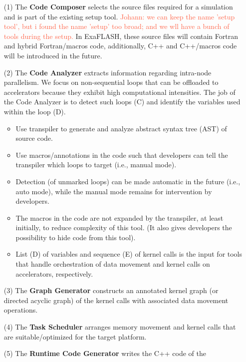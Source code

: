 \documentclass{article}
\newcommand{\FlashOfTheFuture}{ExaFLASH\xspace}
\newcommand{\Johann}[1]         {\textcolor{Tomato}{Johann: #1}}
\begin{document}
\begin{enumerate}
  \item[(1)] The \textbf{Code Composer} selects the source files required for
    a simulation and is part of the existing setup tool.
    \Johann{we can keep the name 'setup tool', but i found the name 'setup' too
    broad; and we wll have a bunch of tools during the setup.}
    In \FlashOfTheFuture, these source files will contain Fortran and hybrid
    Fortran/macros code, additionally, C++ and C++/macros code will be
    introduced in the future.
  \item[(2)] The \textbf{Code Analyzer} extracts information regarding
    intra-node parallelism.  We focus on non-sequential loops that
    can be offloaded to accelerators because they exhibit high computational
    intensities.  The job of the Code Analyzer is to detect such loops (C)
    and identify the variables used within the loop (D).
    \begin{itemize}
      \item Use transpiler to generate and analyze abstract syntax tree (AST)
        of source code.
      \item Use macros/annotations in the code such that developers can
        tell the transpiler which loops to target (i.e., manual mode).
      \item Detection (of unmarked loops) can be made automatic in the future
        (i.e., auto mode), while the manual mode remains for intervention by
        developers.
      \item The macros in the code are not expanded by the transpiler, at least
        initially, to reduce complexity of this tool.  (It also gives
        developers the possibility to hide code from this tool).
      \item List (D) of variables and sequence (E) of kernel calls is the input
        for tools that handle orchestration of data movement and kernel calls
        on accelerators, respectively.
    \end{itemize}
  \item[(3)] The \textbf{Graph Generator} constructs an annotated kernel graph
    (or directed acyclic graph) of the kernel calls with associated data
    movement operations.
  \item[(4)] The \textbf{Task Scheduler} arranges memory movement and kernel
    calls that are suitable/optimized for the target platform.
  \item[(5)] The \textbf{Runtime Code Generator} writes the C++ code of the

\end{enumerate}
\end{document}
